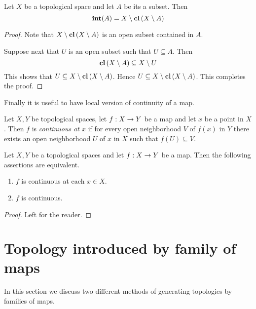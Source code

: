 \begin{fact}\label{fact:relation_between_closure_and_interior}
	Let $X$ be a topological space and let $A$ be its a subset. Then
	$$\mathbf{int}(A) = X\setminus \mathbf{cl}\left(X\setminus A\right)$$
\end{fact}
\begin{proof}
	Note that $X\setminus \mathbf{cl}\left(X\setminus A\right)$ is an open subset contained in $A$.

	Suppose next that $U$ is an open subset such that $U \subseteq A$. Then
	$$\mathbf{cl}\left(X\setminus A\right) \subseteq X\setminus U$$
	This shows that $U \subseteq X\setminus \mathbf{cl}\left(X\setminus A\right)$. Hence $U \subseteq X\setminus \mathbf{cl}\left(X\setminus A\right)$. This completes the proof.
\end{proof}
\noindent
Finally it is useful to have local version of continuity of a map.

\begin{definition}
	Let $X, Y$ be topological spaces, let $f:X\rightarrow Y$ be a map and let $x$ be a point in $X$. Then $f$ is \textit{continuous at $x$} if for every open neighborhood $V$ of $f(x)$ in $Y$ there exists an open neighborhood $U$ of $x$ in $X$ such that $f(U) \subseteq V$.
\end{definition}

\begin{fact}\label{fact:function_continuous_at_each_point_is_continuous}
	Let $X, Y$ be a topological spaces and let $f:X\rightarrow Y$ be a map. Then the following assertions are equivalent.
	\begin{enumerate}[label=\emph{\textbf{(\roman*)}}, leftmargin=3.0em]
		\item $f$ is continuous at each $x \in X$.
		\item $f$ is continuous.
	\end{enumerate}
\end{fact}
\begin{proof}
	Left for the reader.
\end{proof}


\section{Topology introduced by family of maps}
\noindent
In this section we discuss two different methods of generating topologies by families of maps.

